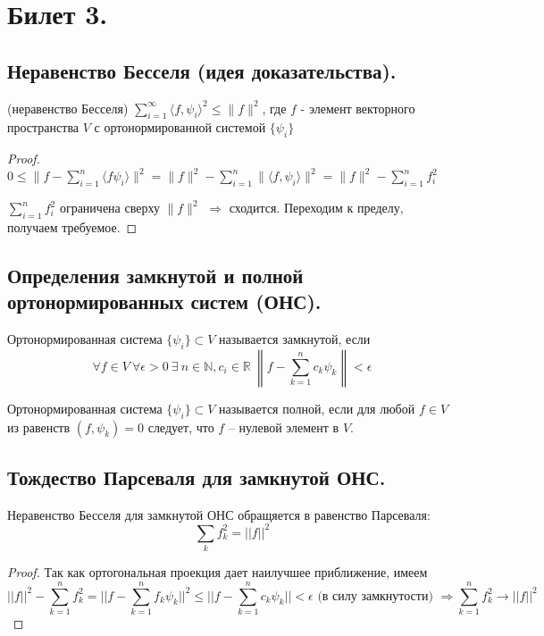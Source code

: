 \section{Билет 3.}

\subsection{Неравенство Бесселя (идея доказательства).}
\begin{theorem} 
    (неравенство Бесселя) $\sum_{i=1}^{\infty} \langle f, \psi_i \rangle^2 \le \| f \|^2$, где $f$ - элемент векторного пространства $V$ с ортонормированной системой $\{{\psi_i}\}$
    \begin{proof}
        $0 \le \| f- \sum_{i=1}^{n} \langle f \psi_i \rangle \|^2=\|f\|^2-\sum_{i=1}^{n} \|\langle f, \psi_i \rangle \|^2=\|f\|^2-\sum_{i=1}^{n} f_i ^2$ 
        
        $\sum_{i=1}^{n} f_i^2$ ограничена сверху $\|f\|^2$ $\Rightarrow$  сходится. Переходим к пределу, получаем требуемое. 
    \end{proof}
\end{theorem}

\subsection{Определения замкнутой и полной ортонормированных систем (ОНС).}
\begin{definition}
    Ортонормированная система $\{\psi_i\} \subset V$ называется замкнутой, если
    \[
        \forall f \in V \>
        \forall \epsilon > 0 \>
        \exists \> n \in \mathbb{N}, c_i \in \mathbb{R} \>
        \left\lVert
            f - \sum_{k=1}^n c_k \psi_k
        \right\rVert < \epsilon
    \]
\end{definition}
\begin{definition}
    Ортонормированная система $\{\psi_i\} \subset V$  называется полной, если для любой $f \in V$ из равенств  $(f, \psi_k) = 0$ следует, что $f$ -- нулевой элемент в $V$.
\end{definition}

\subsection{Тождество Парсеваля для замкнутой ОНС.}
\begin{theorem}
    Неравенство Бесселя для замкнутой ОНС обращяется в равенство Парсеваля:
    \[
        \sum_{k} f_k^2 = ||f||^2
    \]
    \begin{proof}
        Так как ортогональная проекция дает наилучшее приближение, имеем
        \[
            ||f||^2 - \sum_{k=1}^n f_k^2 = ||f - \sum_{k=1}^n f_k \psi_k||^2 \leqslant ||f - \sum_{k=1}^n c_k \psi_k|| < \epsilon \text{ (в силу замкнутости) }
            \Rightarrow
            \sum_{k=1}^n f_k^2 \to ||f||^2
        \]
    \end{proof}
\end{theorem}